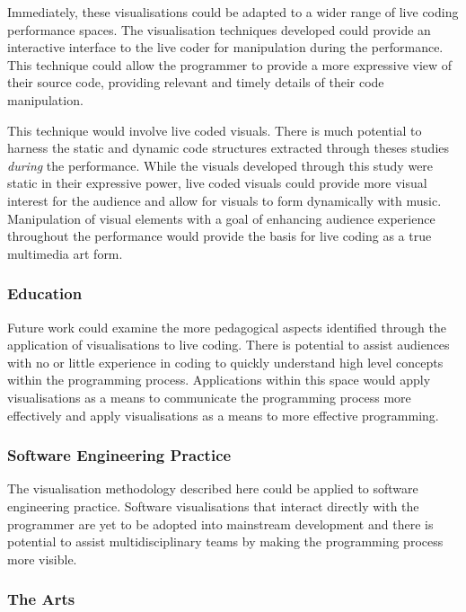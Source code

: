 Immediately, these visualisations could be adapted to a wider range of live coding performance spaces. The visualisation techniques developed could provide an interactive interface to the live coder for manipulation during the performance. This technique could allow the programmer to provide a more expressive view of their source code, providing relevant and timely details of their code manipulation.

This technique would involve live coded visuals. There is much potential to harness the static and dynamic code structures extracted through theses studies \emph{during} the performance. While the visuals developed through this study were static in their expressive power, live coded visuals could provide more visual interest for the audience and allow for visuals to form dynamically with music. Manipulation of visual elements with a goal of enhancing audience experience throughout the performance would provide the basis for live coding as a true multimedia art form.

\subsubsection{Education}

Future work could examine the more pedagogical aspects identified through the application of visualisations to live coding. There is potential to assist audiences with no or little experience in coding to quickly understand high level concepts within the programming process. Applications within this space would apply visualisations as a means to communicate the programming process more effectively and apply visualisations as a means to more effective programming.

\subsubsection{Software Engineering Practice}

The visualisation methodology described here could be applied to software engineering practice. Software visualisations that interact directly with the programmer are yet to be adopted into mainstream development and there is potential to assist multidisciplinary teams by making the programming process more visible.

\subsubsection{The Arts}

